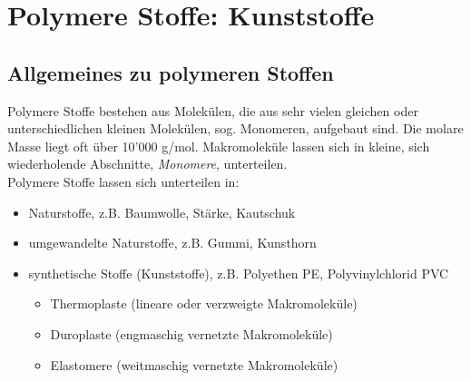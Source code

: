 \section{Polymere Stoffe: Kunststoffe}
\subsection{Allgemeines zu polymeren Stoffen}
Polymere Stoffe bestehen aus Molekülen, die aus sehr vielen gleichen oder unterschiedlichen kleinen Molekülen, sog. Monomeren, aufgebaut sind. Die molare Masse liegt oft über 10'000 g/mol. Makromoleküle lassen sich in kleine, sich wiederholende Abschnitte, \emph{Monomere}, unterteilen. \\

Polymere Stoffe lassen sich unterteilen in:
\begin{itemize}
	\item Naturstoffe, z.B. Baumwolle, Stärke, Kautschuk
	\item umgewandelte Naturstoffe, z.B. Gummi, Kunsthorn
	\item synthetische Stoffe (Kunststoffe), z.B. Polyethen PE, Polyvinylchlorid PVC
	\begin{itemize}
		\item Thermoplaste (lineare oder verzweigte Makromoleküle)
		\item Duroplaste (engmaschig vernetzte Makromoleküle)
		\item Elastomere (weitmaschig vernetzte Makromoleküle)
	\end{itemize}
\end{itemize}

